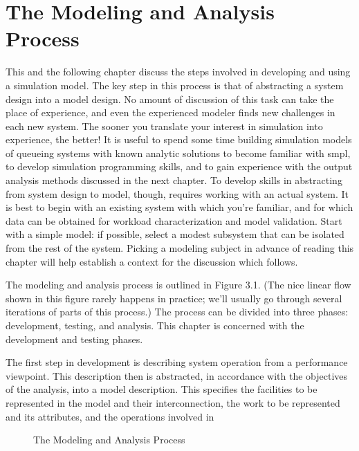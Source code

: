 \setcounter{chapter}{3}
\setcounter{section}{0}
\label{chap:model-development-testing}
\section{The Modeling and Analysis Process}
\label{sec:modeling-analysis-process}

This and the following chapter discuss the steps involved in developing and
using a simulation model. The key step in this process is that of abstracting
 a system design into a model design. No amount of discussion of this task can
take the place of experience, and even the experienced modeler finds new
challenges in each new system. The sooner you translate your interest in
simulation into experience, the better! It is useful to spend some time
building simulation models of queueing systems with known analytic solutions
 to become familiar with smpl, to develop simulation programming skills, and
to gain experience with the output analysis methods discussed in the next
chapter. To develop skills in abstracting from system design to model,
though, requires working with an actual system. It is best to begin with an
existing system with which you're familiar, and for which data can be obtained
for workload characterization and model validation. Start with a simple model:
if possible, select a modest subsystem that can be isolated from the rest of
the system. Picking a modeling subject in advance of reading this chapter will
help establish a context for the discussion which follows.

The modeling and analysis process is outlined in Figure 3.1. (The nice linear
flow shown in this figure rarely happens in practice; we'll usually go through
several iterations of parts of this process.) The process can be divided into
three phases: development, testing, and analysis. This chapter is concerned
with the development and testing phases.

The first step in development is describing system operation from a
performance viewpoint. This description then is abstracted, in accordance
with the objectives of the analysis, into a model description. This specifies
the facilities to be represented in the model and their interconnection, the
work to be represented and its attributes, and the operations involved in
\begin{figure}[H]
\centering
\resizebox{!}{.40\textheight}{}
\caption{The Modeling and Analysis Process}
\end{figure}

